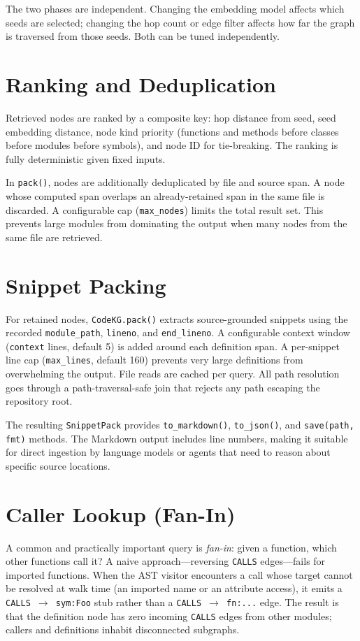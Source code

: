 \documentclass[10pt]{article}
\begin{document}
The two phases are independent. Changing the embedding model affects which seeds
are selected; changing the hop count or edge filter affects how far the graph is
traversed from those seeds. Both can be tuned independently.

\section{Ranking and Deduplication}

Retrieved nodes are ranked by a composite key: hop distance from seed, seed
embedding distance, node kind priority (functions and methods before classes before
modules before symbols), and node ID for tie-breaking. The ranking is fully
deterministic given fixed inputs.

In \texttt{pack()}, nodes are additionally deduplicated by file and source span.
A node whose computed span overlaps an already-retained span in the same file is
discarded. A configurable cap (\texttt{max\_nodes}) limits the total result set.
This prevents large modules from dominating the output when many nodes from the
same file are retrieved.

\section{Snippet Packing}

For retained nodes, \texttt{CodeKG.pack()} extracts source-grounded snippets using
the recorded \texttt{module\_path}, \texttt{lineno}, and \texttt{end\_lineno}.
A configurable context window (\texttt{context} lines, default 5) is added around
each definition span. A per-snippet line cap (\texttt{max\_lines}, default 160)
prevents very large definitions from overwhelming the output. File reads are cached
per query. All path resolution goes through a path-traversal-safe join that rejects
any path escaping the repository root.

The resulting \texttt{SnippetPack} provides \texttt{to\_markdown()},
\texttt{to\_json()}, and \texttt{save(path, fmt)} methods. The Markdown output
includes line numbers, making it suitable for direct ingestion by language models
or agents that need to reason about specific source locations.

\section{Caller Lookup (Fan-In)}
\label{sec:fanin}

A common and practically important query is \emph{fan-in}: given a function, which
other functions call it? A naive approach---reversing \texttt{CALLS} edges---fails
for imported functions. When the AST visitor encounters a call whose target cannot
be resolved at walk time (an imported name or an attribute access), it emits a
\texttt{CALLS $\to$ sym:Foo} stub rather than a \texttt{CALLS $\to$ fn:...} edge.
The result is that the definition node has zero incoming \texttt{CALLS} edges from
other modules; callers and definitions inhabit disconnected subgraphs.
\end{document}
